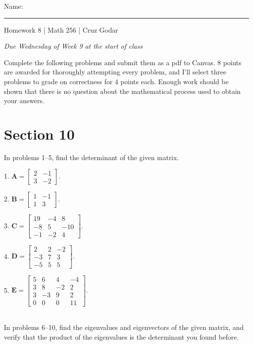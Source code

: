 \documentclass{article}
\begin{document}
\Large Name: \rule{2in}{0.15mm} \hfill Homework 8 | Math 256 | Cruz Godar \vspace{4pt} \normalsize

\textit{Due Wednesday of Week 9 at the start of class}

Complete the following problems and submit them as a pdf to Canvas. 8 points are awarded for thoroughly attempting every problem, and I'll select three problems to grade on correctness for 4 points each. Enough work should be shown that there is no question about the mathematical process used to obtain your answers.

\section{Section 10}

In problems 1--5, find the determinant of the given matrix.

1. $\displaystyle \mathbf{A} = \left[\begin{array}{cc}2& -1 \\ 3& -2\end{array}\right].$

2. $\displaystyle \mathbf{B} = \left[\begin{array}{cc}1& -1 \\ 1& 3\end{array}\right].$

3. $\displaystyle \mathbf{C} = \left[\begin{array}{ccc}19& -4& 8 \\ -8& 5& -10 \\ -1& -2& 4\end{array}\right].$

4. $\displaystyle \mathbf{D} = \left[\begin{array}{ccc}2& 2& -2 \\ -3& 7& 3 \\ -5& 5& 5\end{array}\right].$

5. $\displaystyle \mathbf{E} = \left[\begin{array}{cccc}5& 6& 4& -4 \\ 3& 8& -2& 2 \\ 3& -3& 9& 2 \\ 0& 0& 0& 11\end{array}\right].$

~\\

In problems 6--10, find the eigenvalues and eigenvectors of the given matrix, and verify that the product of the eigenvalues is the determinant you found before.
\end{document}
